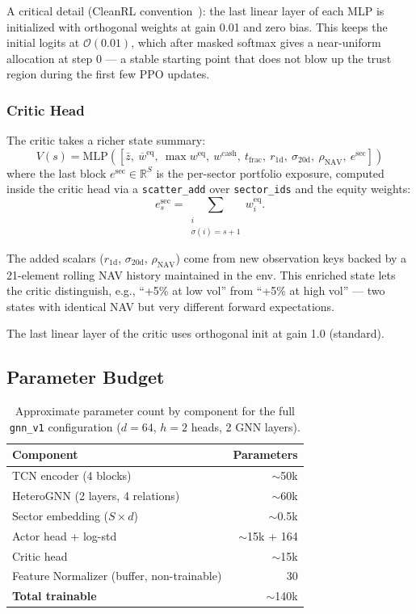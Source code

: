 \documentclass[11pt,a4paper]{article}
\begin{document}
A critical detail (CleanRL convention~\cite{huang2022cleanrl}): the last linear layer
of each MLP is initialized with orthogonal weights at gain 0.01 and zero bias. This
keeps the initial logits at $\mathcal{O}(0.01)$, which after masked softmax gives a
near-uniform allocation at step 0 --- a stable starting point that does not blow up
the trust region during the first few PPO updates.

\subsubsection{Critic Head}

The critic takes a richer state summary:
\[ V(s) = \text{MLP}\left( [\bar{z},\ \overline{w}^{\text{eq}},\ \max w^{\text{eq}},\
   w^{\text{cash}},\ t_{\text{frac}},\ r_{1\text{d}},\ \sigma_{20\text{d}},\ \rho_{\text{NAV}},\
   e^{\text{sec}}] \right) \]
where the last block $e^{\text{sec}} \in \mathbb{R}^S$ is the per-sector portfolio
exposure, computed inside the critic head via a \texttt{scatter\_add} over
\texttt{sector\_ids} and the equity weights:
\[ e^{\text{sec}}_s = \sum_{\substack{i \\ \sigma(i) = s+1}} w_i^{\text{eq}}. \]

The added scalars ($r_{1\text{d}}$, $\sigma_{20\text{d}}$, $\rho_{\text{NAV}}$) come from
new observation keys backed by a 21-element rolling NAV history maintained in the env.
This enriched state lets the critic distinguish, e.g., ``+5\% at low vol'' from
``+5\% at high vol'' --- two states with identical NAV but very different forward
expectations.

The last linear layer of the critic uses orthogonal init at gain 1.0 (standard).

\subsection{Parameter Budget}

\begin{table}[h]
\centering
\caption{Approximate parameter count by component for the full \texttt{gnn\_v1}
configuration ($d = 64$, $h = 2$ heads, 2 GNN layers).}
\small
\begin{tabular}{l r}
\toprule
\textbf{Component} & \textbf{Parameters} \\
\midrule
TCN encoder (4 blocks) & $\sim$50k \\
HeteroGNN (2 layers, 4 relations) & $\sim$60k \\
Sector embedding ($S \times d$) & $\sim$0.5k \\
Actor head + log-std & $\sim$15k + 164 \\
Critic head & $\sim$15k \\
Feature Normalizer (buffer, non-trainable) & 30 \\
\midrule
\textbf{Total trainable} & $\sim$140k \\
\bottomrule
\end{tabular}
\end{table}
\end{document}
